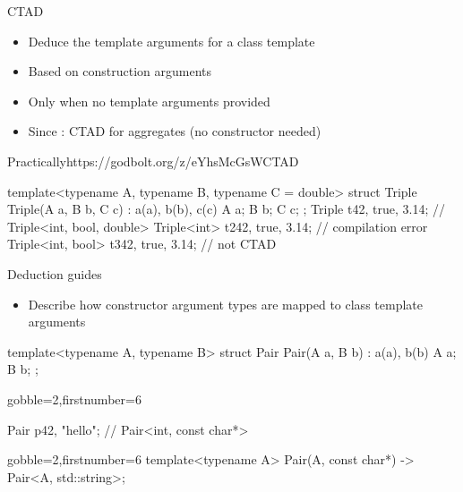 \begin{advanced}
\begin{frame}[fragile]
  \begin{block}{CTAD}
    \begin{itemize}
    \item Deduce the template arguments for a class template
    \item Based on construction arguments
    \item Only when no template arguments provided
    \item Since : CTAD for aggregates (no constructor needed)
    \end{itemize}
  \end{block}
  \begin{exampleblockGB}{Practically}{https://godbolt.org/z/eYhsMcGsW}{CTAD}
    \small
    \begin{cppcode*}{}
      template<typename A, typename B, typename C = double>
      struct Triple {
        Triple(A a, B b, C c) : a(a), b(b), c(c) {}
        A a; B b; C c;
      };
      Triple t{42, true, 3.14}; // Triple<int, bool, double>
      Triple<int> t2{42, true, 3.14}; // compilation error
      Triple<int, bool> t3{42, true, 3.14}; // not CTAD
    \end{cppcode*}
  \end{exampleblockGB}
\end{frame}

\begin{frame}[fragile]
  \begin{block}{Deduction guides}
    \begin{itemize}
    \item Describe how constructor argument types are mapped to class template arguments
    \end{itemize}
  \end{block}
  \begin{cppcode}
    template<typename A, typename B>
    struct Pair {
     Pair(A a, B b) : a(a), b(b) {}
     A a; B b;
    };
  \end{cppcode}
  \begin{overprint}[\columnwidth]
    \begin{cppcode*}{gobble=2,firstnumber=6}



      Pair p{42, "hello"}; // Pair<int, const char*>
    \end{cppcode*}
    \begin{cppcode*}{gobble=2,firstnumber=6}
      template<typename A>
      Pair(A, const char*) -> Pair<A, std::string>;


\end{cppcode*}
\end{overprint}
\end{frame}
\end{advanced}
